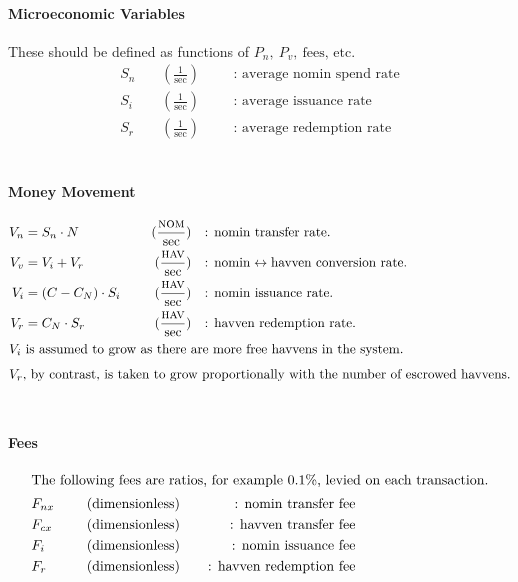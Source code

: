 \paragraph{Microeconomic Variables} These should be defined as functions of \(P_n, \ P_v, \ \text{fees, etc.}\)
\begin{align*}
S_n \ && (\frac{1}{\text{sec}}) && &\text{: average nomin spend rate} \\
S_i \ && (\frac{1}{\text{sec}}) && &\text{: average issuance rate} \\
S_r \ && (\frac{1}{\text{sec}}) && &\text{: average redemption rate}
\end{align*}
\\

\paragraph{Money Movement}
\begin{align*}
    V_n &= S_n \cdot N \ && &(\frac{\textsc{nom}{}}{\text{sec}}) && &\text{: nomin transfer rate.} \\
    V_v &= V_i + V_r \ && &(\frac{\textsc{hav}{}}{\text{sec}}) && &\text{: nomin} \leftrightarrow \text{havven conversion rate.} \\
    V_i &= (C - C_N) \cdot S_i \ && &(\frac{\textsc{hav}{}}{\text{sec}}) && &\text{: nomin issuance rate.} \\
    V_r &= C_N \cdot S_r \ && &(\frac{\textsc{hav}{}}{\text{sec}}) && &\text{: havven redemption rate.} \\
    \intertext{\(V_i\) is assumed to grow as there are more free havvens in the system.}
    \intertext{\(V_r\), by contrast, is taken to grow proportionally with the number of escrowed havvens.}
\end{align*}
\\

\paragraph{Fees}
\begin{align*}
\intertext{The following fees are ratios, for example 0.1\%, levied on each transaction.}
&F_{nx} & \ && &\text{(dimensionless)} && &\text{: nomin transfer fee} \\
&F_{cx} & \ && &\text{(dimensionless)} && &\text{: havven transfer fee} \\
&F_i & \ && &\text{(dimensionless)} && &\text{: nomin issuance fee} \\
&F_r & \ && &\text{(dimensionless)} && &\text{: havven redemption fee} \\
\end{align*}

\pagebreak
